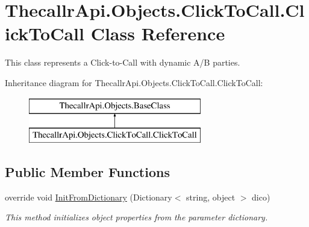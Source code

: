 \hypertarget{class_thecallr_api_1_1_objects_1_1_click_to_call_1_1_click_to_call}{\section{Thecallr\+Api.\+Objects.\+Click\+To\+Call.\+Click\+To\+Call Class Reference}
\label{class_thecallr_api_1_1_objects_1_1_click_to_call_1_1_click_to_call}
}


This class represents a Click-\/to-\/\+Call with dynamic A/\+B parties.  


Inheritance diagram for Thecallr\+Api.\+Objects.\+Click\+To\+Call.\+Click\+To\+Call\+:\begin{figure}[H]
\begin{center}
\leavevmode
\includegraphics[height=2.000000cm]{class_thecallr_api_1_1_objects_1_1_click_to_call_1_1_click_to_call}
\end{center}
\end{figure}
\subsection*{Public Member Functions}
\begin{DoxyCompactItemize}
\item 
override void \hyperlink{class_thecallr_api_1_1_objects_1_1_click_to_call_1_1_click_to_call_a82aa6494acdca5d63a2755b0cbb5781b}{Init\+From\+Dictionary} (Dictionary$<$ string, object $>$ dico)
\begin{DoxyCompactList}\small\item\em This method initializes object properties from the parameter dictionary. \end{DoxyCompactList}\end{DoxyCompactItemize}
